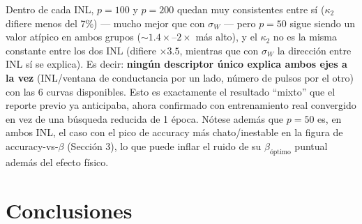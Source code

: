 \documentclass[11pt]{article}
\begin{document}
Dentro de cada INL, $p=100$ y $p=200$ quedan muy consistentes entre sí
($\kappa_2$ difiere menos del 7\%) --- mucho mejor que con $\sigma_W$ ---
pero $p=50$ sigue siendo un valor atípico en ambos grupos (${\sim}1.4\times$--$2\times$
más alto), y el $\kappa_2$ no es la misma constante entre los dos INL
(difiere $\times3.5$, mientras que con $\sigma_W$ la dirección entre INL sí
se explica). Es decir: \textbf{ningún descriptor único explica ambos ejes a
la vez} (INL/ventana de conductancia por un lado, número de pulsos por el
otro) con las 6 curvas disponibles. Esto es exactamente el resultado
``mixto'' que el reporte previo ya anticipaba, ahora confirmado con
entrenamiento real convergido en vez de una búsqueda reducida de 1 época.
Nótese además que $p=50$ es, en ambos INL, el caso con el pico de accuracy
más chato/inestable en la figura de accuracy-vs-$\beta$ (Sección 3), lo que
puede inflar el ruido de su $\beta_{\text{óptimo}}$ puntual además del
efecto físico.

\section{Conclusiones}
\end{document}
